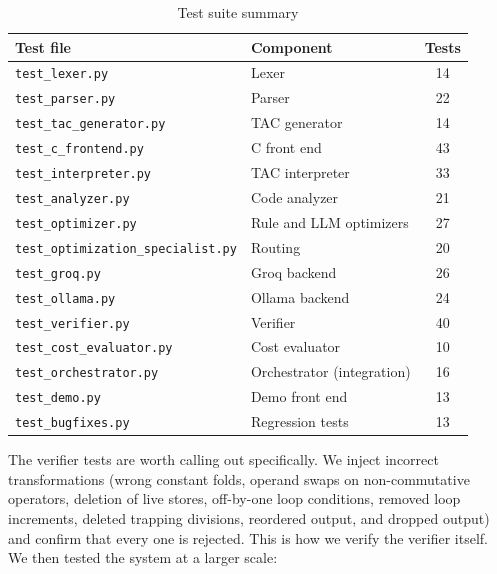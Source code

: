 \documentclass[12pt,a4paper]{report}
\begin{document}
\begin{table}[H]
\centering
\caption{Test suite summary}
\label{tab:tests}
\small
\begin{tabular}{|l|l|c|}
\hline
\textbf{Test file} & \textbf{Component} & \textbf{Tests} \\
\hline
\texttt{test\_lexer.py} & Lexer & 14 \\
\hline
\texttt{test\_parser.py} & Parser & 22 \\
\hline
\texttt{test\_tac\_generator.py} & TAC generator & 14 \\
\hline
\texttt{test\_c\_frontend.py} & C front end & 43 \\
\hline
\texttt{test\_interpreter.py} & TAC interpreter & 33 \\
\hline
\texttt{test\_analyzer.py} & Code analyzer & 21 \\
\hline
\texttt{test\_optimizer.py} & Rule and LLM optimizers & 27 \\
\hline
\texttt{test\_optimization\_specialist.py} & Routing & 20 \\
\hline
\texttt{test\_groq.py} & Groq backend & 26 \\
\hline
\texttt{test\_ollama.py} & Ollama backend & 24 \\
\hline
\texttt{test\_verifier.py} & Verifier & 40 \\
\hline
\texttt{test\_cost\_evaluator.py} & Cost evaluator & 10 \\
\hline
\texttt{test\_orchestrator.py} & Orchestrator (integration) & 16 \\
\hline
\texttt{test\_demo.py} & Demo front end & 13 \\
\hline
\texttt{test\_bugfixes.py} & Regression tests & 13 \\
\hline
\end{tabular}
\end{table}

The verifier tests are worth calling out specifically. We inject incorrect transformations (wrong constant folds, operand swaps on non-commutative operators, deletion of live stores, off-by-one loop conditions, removed loop increments, deleted trapping divisions, reordered output, and dropped output) and confirm that every one is rejected. This is how we verify the verifier itself. We then tested the system at a larger scale:
\end{document}

